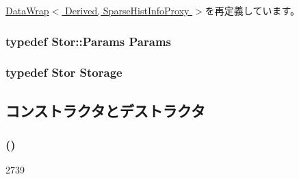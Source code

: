 \hyperlink{classStats_1_1DataWrap_a76d2c248839f34168d2a3760bc1fbdb9}{DataWrap$<$ Derived, SparseHistInfoProxy $>$}を再定義しています。\hypertarget{classStats_1_1SparseHistBase_a24c5f88dc162c95e0b32ade67a7ea674}{
\subsubsection[{Params}]{\setlength{\rightskip}{0pt plus 5cm}typedef Stor::Params {\bf Params}}}
\label{classStats_1_1SparseHistBase_a24c5f88dc162c95e0b32ade67a7ea674}
\hypertarget{classStats_1_1SparseHistBase_a5d4a6db0e7c32292f54a08d05c671bd1}{
\subsubsection[{Storage}]{\setlength{\rightskip}{0pt plus 5cm}typedef Stor {\bf Storage}}}
\label{classStats_1_1SparseHistBase_a5d4a6db0e7c32292f54a08d05c671bd1}


\subsection{コンストラクタとデストラクタ}
\hypertarget{classStats_1_1SparseHistBase_a163ae27d7bb5475e6d6ed7af40c4e050}{
\subsubsection[{SparseHistBase}]{ ()}}
\label{classStats_1_1SparseHistBase_a163ae27d7bb5475e6d6ed7af40c4e050}



\begin{DoxyCode}
2739 { }
\end{DoxyCode}


